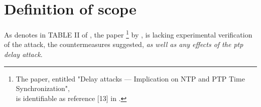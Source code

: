 \section{Definition of scope}



As \citeauthor{moussa2016security}denotes in TABLE II of \cite[p. 1959]{moussa2016security}, the paper \cite{ullmann2009delay}\footnote{ The paper, entitled "Delay attacks — Implication on NTP and PTP Time Synchronization",\\ is  identifiable as reference [13] in \cite{moussa2016security}.} by \citeauthor{ullmann2009delay}, is lacking experimental verification of the attack, the countermeasures  
suggested, \textit{as well as any effects of the \acrshort{ptp} delay attack}. 

